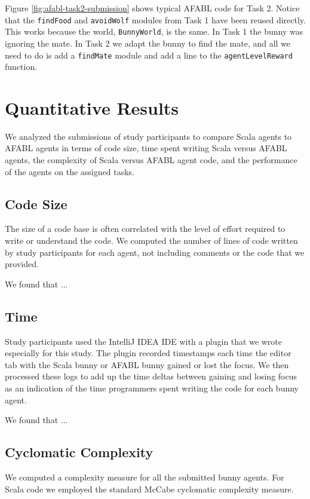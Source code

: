 Figure \ref{fig:afabl-task2-submission} shows typical AFABL code for Task 2. Notice that the {\tt findFood} and {\tt avoidWolf} modules from Task 1 have been reused directly. This works because the world, {\tt BunnyWorld}, is the same. In Task 1 the bunny was ignoring the mate. In Task 2 we adapt the bunny to find the mate, and all we need to do is add a {\tt findMate} module and add a line to the {\tt agentLevelReward} function.

\section{Quantitative Results}

We analyzed the submissions of study participants to compare Scala agents to AFABL agents in terms of code size, time spent writing Scala versus AFABL agents, the complexity of Scala versus AFABL agent code, and the performance of the agents on the assigned tasks.

\subsection{Code Size}

The size of a code base is often correlated with the level of effort required to write or understand the code. We computed the number of lines of code written by study participants for each agent, not including comments or the code that we provided.

We found that ...

\subsection{Time}

Study participants used the IntelliJ IDEA IDE with a plugin that we wrote especially for this study. The plugin recorded timestamps each time the editor tab with the Scala bunny or AFABL bunny gained or lost the focus. We then processed these logs to add up the time deltas between gaining and losing focus as an indication of the time programmers spent writing the code for each bunny agent.

We found that ...

\subsection{Cyclomatic Complexity}

We computed a complexity measure for all the submitted bunny agents. For Scala code we employed the standard McCabe cyclomatic complexity measure.

